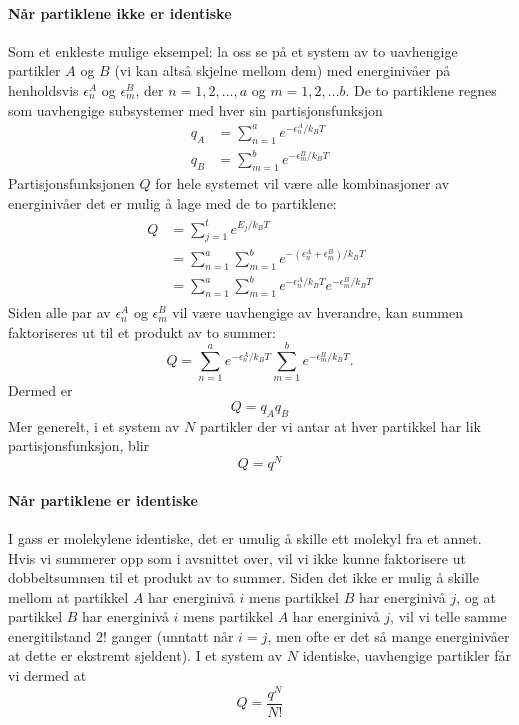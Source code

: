 \paragraph{Når partiklene ikke er identiske} Som et enkleste mulige eksempel: la oss se på et system av to uavhengige partikler $A$ og $B$ (vi kan altså skjelne mellom dem) med energinivåer på henholdsvis $\epsilon_n^A$ og $\epsilon_m^B$, der $n=1,2,...,a$ og $m=1,2,...b$. De to partiklene regnes som uavhengige subsystemer med hver sin partisjonsfunksjon 
\begin{align}
	q_A&=\sum_{n=1}^a e^{-\epsilon_n^A/k_BT} \\
	q_B&=\sum_{m=1}^b e^{-\epsilon_m^B/k_BT}
\end{align}
Partisjonsfunksjonen $Q$ for hele systemet vil være alle kombinasjoner av energinivåer det er mulig å lage med de to partiklene: 
\begin{align}
\begin{split}
	Q&=\sum_{j=1}^t e^{E_j/k_BT}\\&=\sum_{n=1}^a\sum_{m=1}^b e^{-(\epsilon_n^A+\epsilon_m^B)/k_BT}\\&=\sum_{n=1}^a\sum_{m=1}^b e^{-\epsilon_n^A/k_BT}e^{-\epsilon_m^B/k_BT}
\end{split}
\end{align}
Siden alle par av $\epsilon_n^A$ og $\epsilon_m^B$ vil være uavhengige av hverandre, kan summen faktoriseres ut til et produkt av to summer:
\begin{equation}
	Q=\sum_{n=1}^a e^{-\epsilon_n^A/k_BT} \sum_{m=1}^b e^{-\epsilon_m^B/k_BT}.	
\end{equation}
Dermed er
\begin{equation}
	Q=q_Aq_B
\end{equation}
Mer generelt, i et system av $N$ partikler der vi antar at hver partikkel har lik partisjonsfunksjon, blir
\begin{equation}
	Q=q^N
\end{equation}

\paragraph{Når partiklene er identiske} I gass er molekylene identiske, det er umulig å skille ett molekyl fra et annet. Hvis vi summerer opp som i avsnittet over, vil vi ikke kunne faktorisere ut dobbeltsummen til et produkt av to summer. Siden det ikke er mulig å skille mellom at partikkel $A$ har energinivå $i$ mens partikkel $B$ har energinivå $j$, og at partikkel $B$ har energinivå $i$ mens partikkel $A$ har energinivå $j$, vil vi telle samme energitilstand $2!$ ganger (unntatt når $i=j$, men ofte er det så mange energinivåer at dette er ekstremt sjeldent). I et system av $N$ identiske, uavhengige partikler får vi dermed at 
\begin{equation}
	Q=\frac{q^N}{N!}
\end{equation}

